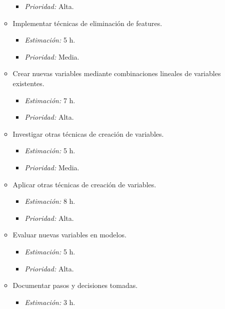 \documentclass[
11pt, %
]{charter}
\begin{document}
\begin{itemize}
\begin{itemize}
\begin{itemize}
                    \item \textit{Prioridad:} Alta.
                \end{itemize}
            \item Implementar técnicas de eliminación de features.
                \begin{itemize}
                    \item \textit{Estimación:} 5 h.
                    \item \textit{Prioridad:} Media.
                \end{itemize}
            \item Crear nuevas variables mediante combinaciones lineales de variables existentes.
                \begin{itemize}
                    \item \textit{Estimación:} 7 h.
                    \item \textit{Prioridad:} Alta.
                \end{itemize}
            \item Investigar otras técnicas de creación de variables.
                \begin{itemize}
                    \item \textit{Estimación:} 5 h.
                    \item \textit{Prioridad:} Media.
                \end{itemize}
            \item Aplicar otras técnicas de creación de variables.
                \begin{itemize}
                    \item \textit{Estimación:} 8 h.
                    \item \textit{Prioridad:} Alta.
                \end{itemize}
            \item Evaluar nuevas variables en modelos.
                \begin{itemize}
                    \item \textit{Estimación:} 5 h.
                    \item \textit{Prioridad:} Alta.
                \end{itemize}
            \item Documentar pasos y decisiones tomadas.
                \begin{itemize}
                    \item \textit{Estimación:} 3 h.

\end{itemize}
\end{itemize}
\end{itemize}
\end{document}
